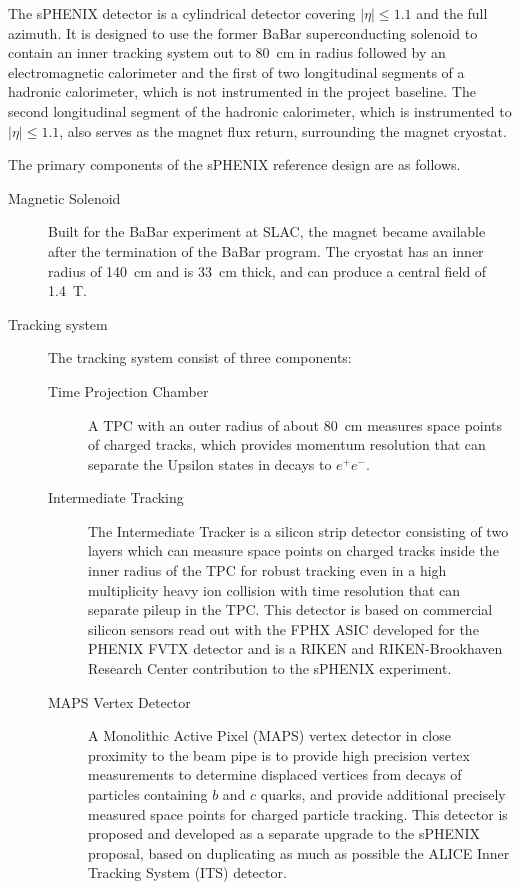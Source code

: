 The sPHENIX detector is a cylindrical detector covering
$\left|\eta\right| \leq 1.1$ and the full azimuth.  It is designed to use
the former BaBar superconducting solenoid to contain
an inner tracking system out to 80~cm in radius followed by an
electromagnetic calorimeter and the first of two longitudinal segments of
a hadronic calorimeter, which is not instrumented in the project baseline.  The second
longitudinal segment of the hadronic calorimeter, which is instrumented to
$|\eta| \leq 1.1$, also serves as
the magnet flux return, surrounding the magnet cryostat.


The primary components of the sPHENIX reference design are as follows.

\begin{description}

\item[Magnetic Solenoid]  Built for the BaBar experiment at
  SLAC, the magnet became available after the termination of the BaBar
  program.  The cryostat has an inner radius of 140~cm and is 33~cm
  thick, and can produce a central field of 1.4~T.

\item[Tracking system] The tracking system consist of three components:

\begin{description}

\item[Time Projection Chamber] A TPC with an outer radius of about 80~cm
measures space points of charged tracks, which provides momentum resolution that can
separate the Upsilon states in decays to $e^+e^-$.

\item[Intermediate Tracking] The Intermediate Tracker is a silicon strip
detector consisting of two layers which can measure space points
on charged tracks inside the inner radius of the TPC for robust tracking
even in a high multiplicity heavy ion collision with time resolution that
can separate pileup in the TPC.
This detector is based on commercial silicon
sensors read out with the FPHX ASIC developed for the PHENIX FVTX detector and
is a RIKEN and RIKEN-Brookhaven Research Center contribution to the sPHENIX
experiment.

\item[MAPS Vertex Detector] A Monolithic Active Pixel (MAPS) vertex
detector in close proximity to the beam pipe is to provide high precision
vertex measurements to determine displaced vertices from decays
of particles containing $b$ and $c$ quarks, and provide additional precisely
measured space points for charged particle tracking.  This detector is
proposed and developed as a separate upgrade to the sPHENIX proposal,
based on duplicating as much as possible the ALICE Inner Tracking System (ITS)
detector.


\end{description}
\end{description}
